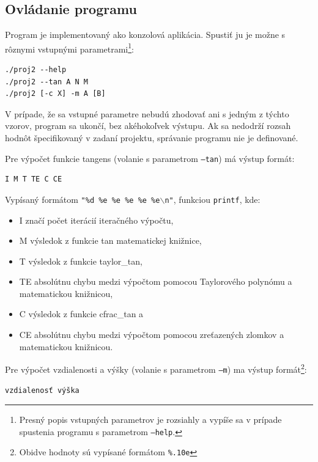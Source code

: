 \documentclass[12pt,a4paper,titlepage,final]{article}
\begin{document}
\subsection{Ovládanie programu}

Program je implementovaný ako konzolová aplikácia. Spustiť ju je možne s rôznymi vstupnými parametrami\footnote{Presný popis vstupných parametrov je rozsiahly a vypíše sa v prípade spustenia programu s parametrom \texttt{--help}.}:

\begin{verbatim}
./proj2 --help
./proj2 --tan A N M
./proj2 [-c X] -m A [B]
\end{verbatim}

V prípade, že sa vstupné parametre nebudú zhodovať ani s jedným z týchto vzorov, program sa ukončí, bez akéhokoľvek výstupu. Ak sa nedodrží rozsah hodnôt špecifikovaný v zadaní projektu, správanie programu nie je definované.

Pre výpočet funkcie tangens (volanie s parametrom \texttt{--tan}) má výstup formát:

\begin{verbatim}
I M T TE C CE
\end{verbatim}

Vypísaný formátom \texttt{"\%d \%e \%e \%e \%e \%e$\backslash$n"}, funkciou \texttt{printf}, kde:
\begin{itemize}
\setlength\itemsep{0em}
\item I značí počet iterácií iteračného výpočtu, 
\item M výsledok z funkcie tan matematickej knižnice,
\item T výsledok z funkcie taylor\_tan,
\item TE absolútnu chybu medzi výpočtom pomocou Taylorového polynómu a matematickou knižnicou,
\item C výsledok z funkcie cfrac\_tan a
\item CE absolútnu chybu medzi výpočtom pomocou zreťazených zlomkov a matematickou knižnicou.
\end{itemize}

Pre výpočet vzdialenosti a výšky (volanie s parametrom \texttt{--m}) ma výstup formát\footnote{Obidve hodnoty sú vypísané formátom \texttt{\%.10e}}:

\begin{verbatim}
vzdialenosť výška
\end{verbatim}
\end{document}
